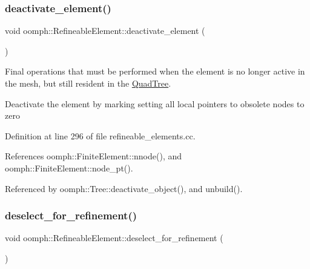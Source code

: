 \mbox{\label{classoomph_1_1RefineableElement_a4931ee06e1f064f286eed647483475b3}} 
\subsubsection{\texorpdfstring{deactivate\+\_\+element()}{deactivate\_element()}}
{\footnotesize\ttfamily void oomph\+::\+Refineable\+Element\+::deactivate\+\_\+element (\begin{DoxyParamCaption}{ }\end{DoxyParamCaption})\hspace{0.3cm}{\ttfamily [virtual]}}



Final operations that must be performed when the element is no longer active in the mesh, but still resident in the \hyperlink{classoomph_1_1QuadTree}{Quad\+Tree}. 

Deactivate the element by marking setting all local pointers to obsolete nodes to zero 

Definition at line 296 of file refineable\+\_\+elements.\+cc.



References oomph\+::\+Finite\+Element\+::nnode(), and oomph\+::\+Finite\+Element\+::node\+\_\+pt().



Referenced by oomph\+::\+Tree\+::deactivate\+\_\+object(), and unbuild().

\mbox{\label{classoomph_1_1RefineableElement_a984bf7bf6132e11648e3e54845d852b7}} 
\subsubsection{\texorpdfstring{deselect\+\_\+for\+\_\+refinement()}{deselect\_for\_refinement()}}
{\footnotesize\ttfamily void oomph\+::\+Refineable\+Element\+::deselect\+\_\+for\+\_\+refinement (\begin{DoxyParamCaption}{ }\end{DoxyParamCaption})\hspace{0.3cm}{\ttfamily [inline]}}



